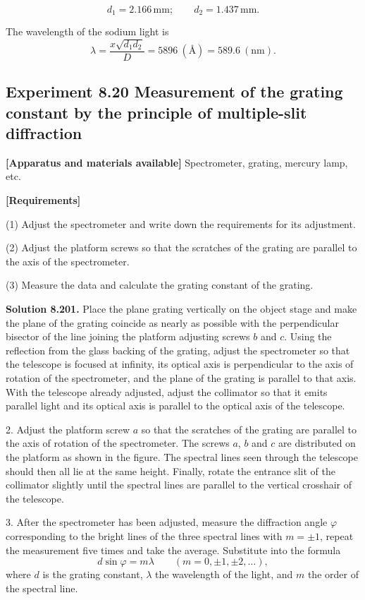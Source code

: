 \[
d_1=2.166\,\mathrm{mm};\qquad d_2=1.437\,\mathrm{mm}.
\]

The wavelength of the sodium light is
\[
\lambda=\frac{x\sqrt{d_1d_2}}{D}=5896\ (\text{\AA})=589.6\ (\mathrm{nm}).
\]

\subsection*{Experiment 8.20 \quad Measurement of the grating constant by the principle of multiple-slit diffraction}

\textbf{[Apparatus and materials available]} Spectrometer, grating, mercury lamp, etc.

\textbf{[Requirements]}

(1) Adjust the spectrometer and write down the requirements for its adjustment.

(2) Adjust the platform screws so that the scratches of the grating are parallel to the axis of the spectrometer.

(3) Measure the data and calculate the grating constant of the grating.

\textbf{Solution 8.20}\quad \textbf{1.} Place the plane grating vertically on the object stage and make the plane of the grating coincide as nearly as possible with the perpendicular bisector of the line joining the platform adjusting screws $b$ and $c$. Using the reflection from the glass backing of the grating, adjust the spectrometer so that the telescope is focused at infinity, its optical axis is perpendicular to the axis of rotation of the spectrometer, and the plane of the grating is parallel to that axis. With the telescope already adjusted, adjust the collimator so that it emits parallel light and its optical axis is parallel to the optical axis of the telescope.

2. Adjust the platform screw $a$ so that the scratches of the grating are parallel to the axis of rotation of the spectrometer. The screws $a$, $b$ and $c$ are distributed on the platform as shown in the figure. The spectral lines seen through the telescope should then all lie at the same height. Finally, rotate the entrance slit of the collimator slightly until the spectral lines are parallel to the vertical crosshair of the telescope.

3. After the spectrometer has been adjusted, measure the diffraction angle $\varphi$ corresponding to the bright lines of the three spectral lines with $m=\pm1$, repeat the measurement five times and take the average. Substitute into the formula
\begin{equation}
d\sin\varphi=m\lambda\qquad(m=0,\pm1,\pm2,\ldots), \tag{1}
\end{equation}
where $d$ is the grating constant, $\lambda$ the wavelength of the light, and $m$ the order of the spectral line.

